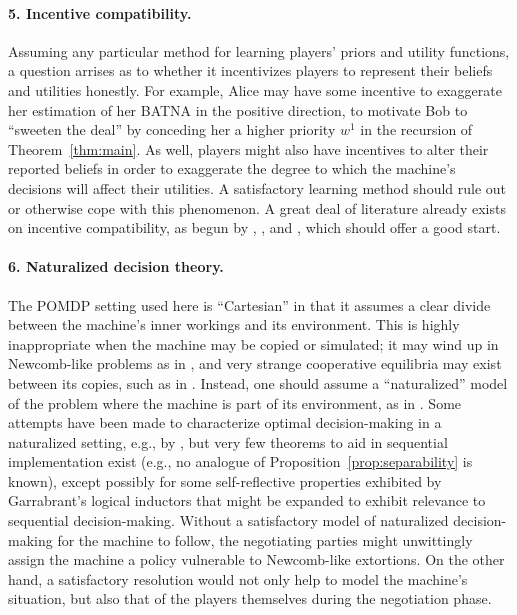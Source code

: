 \documentclass{article}  %
\newcommand{\thm}[1]{Theorem~\ref{thm:#1}}
\newcommand{\prop}[1]{Proposition~\ref{prop:#1}}
\begin{document}
\paragraph{5. Incentive compatibility.}  Assuming any particular method for learning players' priors and utility functions, a question arrises as to whether it incentivizes players to represent their beliefs and utilities honestly.  For example, Alice  may have some incentive to exaggerate her estimation of her BATNA in the positive direction, to motivate Bob to ``sweeten the deal'' by conceding her a higher priority $w^1$ in the recursion of \thm{main}.  As well, players might also have incentives to alter their reported beliefs in order to exaggerate the degree to which the machine's decisions will affect their utilities.  A satisfactory learning method should rule out or otherwise cope with this phenomenon.  A great deal of literature already exists on incentive compatibility, as begun by \citet{hurwicz1972informationally}, \citet{myerson1979incentive}, and \citet{myerson1983efficient}, which should offer a good start.


\paragraph{6. Naturalized decision theory.} The POMDP setting used here is ``Cartesian'' in that it assumes a clear divide between the machine's inner workings and its environment.  This is highly inappropriate when the machine may be copied or simulated; it may wind up in Newcomb-like problems as in \citet{soares2015toward}, and very strange cooperative equilibria may exist between its copies, such as in \citet{critch2016parametric}.  Instead, one should assume a ``naturalized'' model of the problem where the machine is part of its environment, as in \citet{fallenstein2015reflective}.  Some attempts have been made to characterize optimal decision-making in a naturalized setting, e.g., by  \citet{orseau2012space}, but very few theorems to aid in sequential implementation exist (e.g., no analogue of \prop{separability} is known), except possibly for some self-reflective properties exhibited by Garrabrant's logical inductors \citep{garrabrant2016logical} that might be expanded to exhibit relevance to sequential decision-making.   Without a satisfactory model of naturalized decision-making for the machine to follow, the negotiating parties might unwittingly assign the machine a policy vulnerable to Newcomb-like extortions.  On the other hand, a satisfactory resolution would not only help to model the machine's situation, but also that of the players themselves during the negotiation phase.
\end{document}
